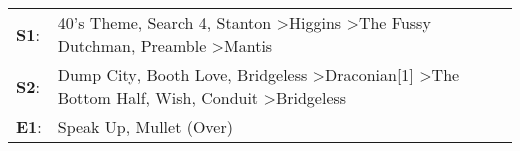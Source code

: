 \begin{supertabular}{p{0.03\textwidth}p{0.92\textwidth}}
 \textbf{S1}:  &                                            40's Theme\textsuperscript{}, \enspace Search 4\textsuperscript{}, \enspace Stanton\textsuperscript{} \textgreater \enspace Higgins\textsuperscript{} \textgreater \enspace The Fussy Dutchman\textsuperscript{}, \enspace Preamble\textsuperscript{} \textgreater \enspace Mantis\textsuperscript{}  \enspace  \\
 \textbf{S2}:  &  Dump City\textsuperscript{}, \enspace Booth Love\textsuperscript{}, \enspace Bridgeless\textsuperscript{} \textgreater \enspace Draconian[1]\textsuperscript{} \textgreater \enspace The Bottom Half\textsuperscript{}, \enspace Wish\textsuperscript{}, \enspace Conduit\textsuperscript{} \textgreater \enspace Bridgeless\textsuperscript{}  \enspace  \\
 \textbf{E1}:  &                                                                                                                                                                                                                                                                            Speak Up\textsuperscript{}, \enspace Mullet (Over)\textsuperscript{}  \enspace  \\
\end{supertabular}
